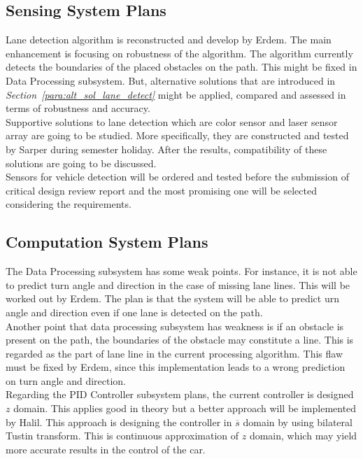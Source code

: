 \documentclass[a4paper,12pt]{article}
\begin{document}
	\subsection{Sensing System Plans}
	Lane detection algorithm is reconstructed and develop by Erdem. The main enhancement is focusing on robustness of the algorithm. The algorithm currently detects the boundaries of the placed obstacles on the path. This might be fixed in Data Processing subsystem. But, alternative solutions that are introduced in \textit{Section~\ref{para:alt_sol_lane_detect}} might be applied, compared and assessed in terms of robustness and accuracy.\\
	   
	Supportive solutions to lane detection which are color sensor and laser sensor array are going to be studied. More specifically, they are constructed and tested by Sarper during semester holiday. After the results, compatibility of these solutions are going to be discussed.\\
	
	Sensors for vehicle detection will be ordered and tested before the submission of critical design review report and the most promising one will be selected considering the requirements.
	
	\subsection{Computation System Plans}
	The Data Processing subsystem has some weak points. For instance, it is not able to predict turn angle and direction in the case of missing lane lines. This will be worked out by Erdem. The plan is that the system will be able to predict urn angle and direction even if one lane is detected on the path.\\
	
	Another point that data processing subsystem has weakness is if an obstacle is present on the path, the boundaries of the obstacle may constitute a line. This is regarded as the part of lane line in the current processing algorithm. This flaw must be fixed by Erdem, since this implementation leads to a wrong prediction on turn angle and direction.\\
	
	Regarding the PID Controller subsystem plans, the current controller is designed $z$ domain. This applies good in theory but a better approach will be implemented by Halil. This approach is designing the controller in $\overline{s}$ domain by using bilateral Tustin transform. This is continuous approximation of $z$ domain, which may yield more accurate results in the control of the car.
	
\end{document}
